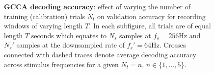 \begin{figure}[htp]
\caption[GCCA decoding accuracy: effect of varying the number of training (calibration) trials $N_t$ on validation accuracy for recording windows of varying length $T$.]{\textbf{GCCA decoding accuracy}: effect of varying the number of training (calibration) trials $N_t$ on validation accuracy for recording windows of varying length $T$. In each subfigure, all trials are of equal length $T$ seconds which equates to $N_s$ samples at $f_s=256$Hz and $N_s'$ samples at the downsampled rate of $f_s'=64$Hz. Crosses connected with dashed traces denote average decoding accuracy across stimulus frequencies for a given $N_t=n, \, n\in\{1, \dots, 5\}$.}
\label{fig:gcca-acc-nt}
\end{figure}


\begin{figure}[htp]
\hfill
{}


\end{figure}
